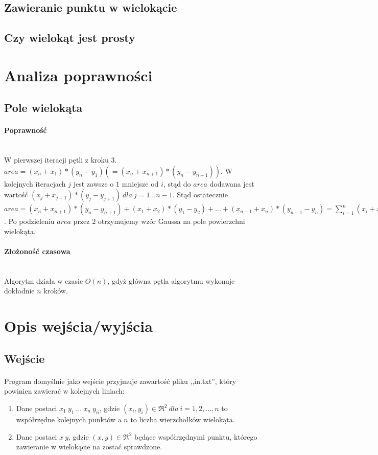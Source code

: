 \documentclass{article}
\begin{document}
\subsection{Zawieranie punktu w wielokącie}
\subsection{Czy wielokąt jest prosty}
\section{Analiza poprawności}
\subsection{Pole wielokąta}
\paragraph{Poprawność} \mbox{}\\
W pierwszej iteracji pętli z kroku 3. \(area = (x_n+x_1)*(y_n-y_1) (=(x_n+x_{n+1})*(y_n-y_{n+1}))\). W kolejnych iteracjach \(j\) jest zawsze o \(1\) mniejsze od \(i\), stąd do \(area\) dodawana jest wartość \((x_j+x_{j+1})*(y_j-y_{j+1})\ dla\ j = 1...n-1\). Stąd ostatecznie \(area = (x_n+x_{n+1})*(y_n-y_{n+1}) + (x_1+x_2)*(y_1-y_2) + ... + (x_{n-1}+x_n)*(y_{n-1}-y_{n}) = \sum\limits_{i=1}^n (x_i+x_{i+1})*(y_{i+1}-y_i)\). Po podzieleniu \(area\) przez \(2\) otrzymujemy wzór Gaussa na pole powierzchni wielokąta.
\paragraph{Złożoność czasowa} \mbox{}\\
Algorytm działa w czasie \(O(n)\), gdyż główna pętla algorytmu wykonuje dokładnie \(n\) kroków.
\section{Opis wejścia/wyjścia}
\subsection{Wejście}
\paragraph{}Program domyślnie jako wejście przyjmuje zawartość pliku ,,in.txt'', który powinien zawierać w kolejnych liniach:
\begin{enumerate}
\item Dane postaci \(x_1\ y_1\ ...\ x_n\ y_n\), gdzie \((x_i,y_i) \in \Re^{2} \ dla\ i=1,2,...,n\) to współrzędne kolejnych punktów a \(n\) to liczba wierzchołków wielokąta.
\item Dane postaci \(x\ y\), gdzie \((x,y) \in \Re^{2}\) będące współrzędnymi punktu, którego zawieranie w wielokącie na zostać sprawdzone.
\end{enumerate}
\end{document}
